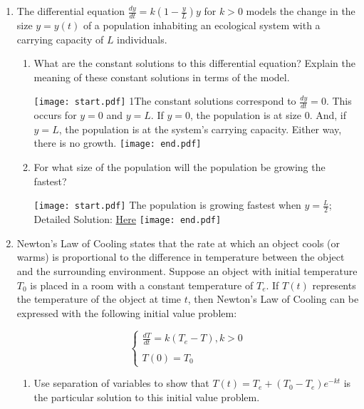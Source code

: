 \documentclass[12pt]{article}
\begin{document}
\begin{enumerate}
\begin{enumerate}
\end{enumerate}

\item The differential equation $\frac{dy}{dt}=k\left(1-\frac{y}{L}\right)y$ for $k>0$ models the change in the size $y=y(t)$ of a population inhabiting an ecological system with a carrying capacity of $L$ individuals.

\begin{enumerate}

\item What are the constant solutions to this differential equation?  Explain the meaning of these constant solutions in terms of the model.

\texttt{[image: start.pdf]}
{{{1\linewidth}{The constant solutions correspond to $\frac{dy}{dt}=0$.  This occurs for $y=0$ and $y=L$.  If $y=0$, the population is at size 0.  And, if $y=L$, the population is at the system's carrying capacity.  Either way, there is no growth.}}}
\texttt{[image: end.pdf]}


\item For what size of the population will the population be growing the fastest?

\texttt{[image: start.pdf]}
{{The population is growing fastest when $y=\frac{L}{2}$; Detailed Solution: \textcolor{blue}{\href{http://www.math.drexel.edu/classes/Calculus/resources/Math123HW/Solutions/123_02_Modeling_09.pdf}{Here}}}}
\texttt{[image: end.pdf]}


\end{enumerate}

\item Newton's Law of Cooling states that the rate at which an object cools (or warms) is proportional to the difference in temperature between the object and the surrounding environment.  Suppose an object with initial temperature $T_0$ is placed in a room with a constant temperature of $T_e$.  If $T(t)$ represents the temperature of the object at time $t$, then Newton's Law of Cooling can be expressed with the following initial value problem:

$$\left\{\begin{array}{l}
\frac{dT}{dt}=k(T_e-T), k>0\\
\\
T(0)=T_0
\end{array}\right.$$

\begin{enumerate}

\item Use separation of variables to show that $T(t)=T_e + (T_0 - T_e)e^{-kt}$ is the particular solution to this initial value problem.


\end{enumerate}
\end{enumerate}
\end{document}
